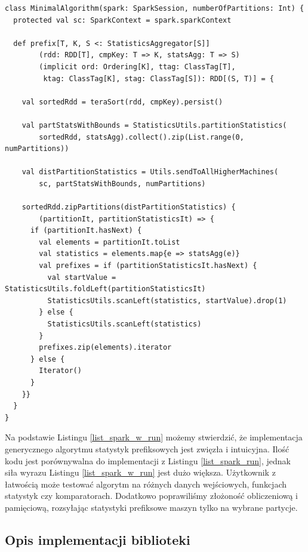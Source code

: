 \documentclass[magisterska]{pracamgr}
\begin{document}
\newpage
\begin{lstlisting}[language=SmallJava,firstnumber=1,label=list_spark_w_run,caption=Implementacja algorytmu statystyk prefiksowych z wykorzystaniem biblioteki]
class MinimalAlgorithm(spark: SparkSession, numberOfPartitions: Int) {
  protected val sc: SparkContext = spark.sparkContext
  
  def prefix[T, K, S <: StatisticsAggregator[S]]
        (rdd: RDD[T], cmpKey: T => K, statsAgg: T => S)
        (implicit ord: Ordering[K], ttag: ClassTag[T],
         ktag: ClassTag[K], stag: ClassTag[S]): RDD[(S, T)] = {
         
    val sortedRdd = teraSort(rdd, cmpKey).persist()
    
    val partStatsWithBounds = StatisticsUtils.partitionStatistics(
        sortedRdd, statsAgg).collect().zip(List.range(0, numPartitions))
        
    val distPartitionStatistics = Utils.sendToAllHigherMachines(
        sc, partStatsWithBounds, numPartitions)
        
    sortedRdd.zipPartitions(distPartitionStatistics) {
        (partitionIt, partitionStatisticsIt) => {
      if (partitionIt.hasNext) {
        val elements = partitionIt.toList
        val statistics = elements.map{e => statsAgg(e)}
        val prefixes = if (partitionStatisticsIt.hasNext) {
          val startValue = StatisticsUtils.foldLeft(partitionStatisticsIt)
          StatisticsUtils.scanLeft(statistics, startValue).drop(1)
        } else {
          StatisticsUtils.scanLeft(statistics)
        }
        prefixes.zip(elements).iterator
      } else {
        Iterator()
      }
    }}
  }
}
\end{lstlisting}

Na podstawie Listingu \ref{list_spark_w_run} możemy stwierdzić, że implementacja generycznego algorytmu statystyk prefiksowych jest zwięzła i intuicyjna. Ilość kodu jest porównywalna do implementacji z Listingu \ref{list_spark_run}, jednak siła wyrazu Listingu \ref{list_spark_w_run} jest dużo większa. Użytkownik z łatwością może testować algorytm na różnych danych wejściowych, funkcjach statystyk czy komparatorach. Dodatkowo poprawiliśmy złożoność obliczeniową i pamięciową, rozsyłając statystyki prefiksowe maszyn tylko na wybrane partycje.

\subsection{Opis implementacji biblioteki}
\end{document}
